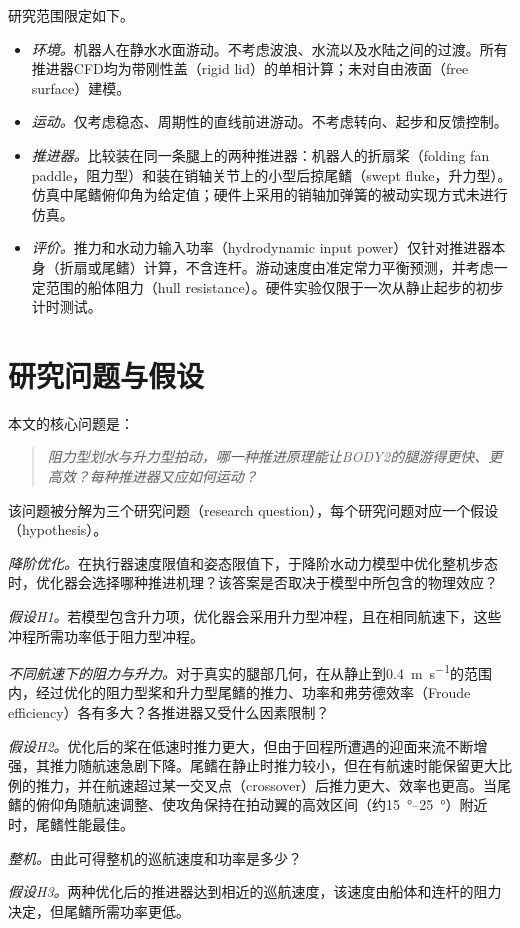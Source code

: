 研究范围限定如下。
\begin{itemize}
  \item \emph{环境。}机器人在静水水面游动。不考虑波浪、水流以及水陆之间的过渡。所有推进器CFD均为带刚性盖（rigid lid）的单相计算；未对自由液面（free surface）建模。
  \item \emph{运动。}仅考虑稳态、周期性的直线前进游动。不考虑转向、起步和反馈控制。
  \item \emph{推进器。}比较装在同一条腿上的两种推进器：机器人的折扇桨（folding fan paddle，阻力型）和装在销轴关节上的小型后掠尾鳍（swept fluke，升力型）。仿真中尾鳍俯仰角为给定值；硬件上采用的销轴加弹簧的被动实现方式未进行仿真。
  \item \emph{评价。}推力和水动力输入功率（hydrodynamic input power）仅针对推进器本身（折扇或尾鳍）计算，不含连杆。游动速度由准定常力平衡预测，并考虑一定范围的船体阻力（hull resistance）。硬件实验仅限于一次从静止起步的初步计时测试。
\end{itemize}

\section{研究问题与假设}

本文的核心问题是：
\begin{quote}
\itshape 阻力型划水与升力型拍动，哪一种推进原理能让BODY2的腿游得更快、更高效？每种推进器又应如何运动？
\end{quote}
该问题被分解为三个研究问题（research question），每个研究问题对应一个假设（hypothesis）。

\begin{description}[leftmargin=12mm,style=nextline]
\item[(RQ1)] \emph{降阶优化。}在执行器速度限值和姿态限值下，于降阶水动力模型中优化整机步态时，优化器会选择哪种推进机理？该答案是否取决于模型中所包含的物理效应？

  \emph{假设H1。}若模型包含升力项，优化器会采用升力型冲程，且在相同航速下，这些冲程所需功率低于阻力型冲程。

\item[(RQ2)] \emph{不同航速下的阻力与升力。}对于真实的腿部几何，在从静止到\SI{0.4}{\metre\per\second}的范围内，经过优化的阻力型桨和升力型尾鳍的推力、功率和弗劳德效率（Froude efficiency）各有多大？各推进器又受什么因素限制？

  \emph{假设H2。}优化后的桨在低速时推力更大，但由于回程所遭遇的迎面来流不断增强，其推力随航速急剧下降。尾鳍在静止时推力较小，但在有航速时能保留更大比例的推力，并在航速超过某一交叉点（crossover）后推力更大、效率也更高。当尾鳍的俯仰角随航速调整、使攻角保持在拍动翼的高效区间（约\SIrange{15}{25}{\degree}）附近时，尾鳍性能最佳。

\item[(RQ3)] \emph{整机。}由此可得整机的巡航速度和功率是多少？

  \emph{假设H3。}两种优化后的推进器达到相近的巡航速度，该速度由船体和连杆的阻力决定，但尾鳍所需功率更低。
\end{description}

